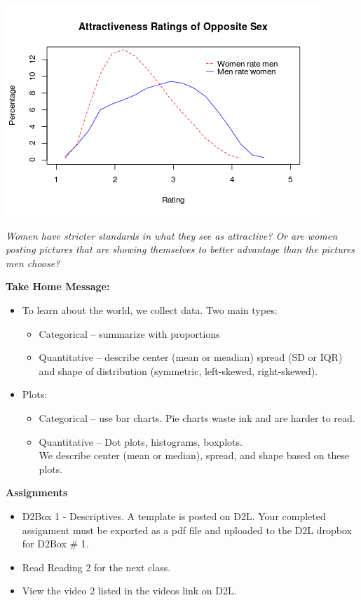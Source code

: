 \begin{enumerate}
 \includegraphics[width=.5\linewidth]{../plots/RateMenAndWomen.png}
\begin{students}
\vfill
\end{students}

\begin{key}
  {\it  Women have stricter standards in what they see as attractive?
     Or are women posting pictures that are showing themselves to
     better advantage than the pictures men choose?}
\end{key}
\end{enumerate}
  



\begin{center}
  {\bf Take Home Message:}
\end{center}
\begin{itemize}
\item To learn about the world, we collect data. Two main types:
  \begin{itemize}
  \item Categorical -- summarize with proportions
  \item Quantitative -- describe center (mean or meadian) spread (SD
    or IQR) and shape of distribution (symmetric, left-skewed,
    right-skewed). 
  \end{itemize}
\item Plots:
  \begin{itemize}
  \item Categorical -- use bar charts. Pie charts waste ink and are
    harder to read.
  \item Quantitative -- Dot plots, histograms, boxplots.\\
    We describe center (mean or median), spread, and shape based on
    these plots.
  \end{itemize}
\end{itemize} \vfill



{\bf Assignments}
\begin{itemize}
\item D2Box 1 - Descriptives.  A template is posted on D2L.
  Your completed assignment must be exported as a pdf file and uploaded
  to the D2L dropbox for D2Box \# 1.
\item Read Reading 2 for the next class.
\item View the video 2 listed in the videos link on D2L.
\end{itemize}

